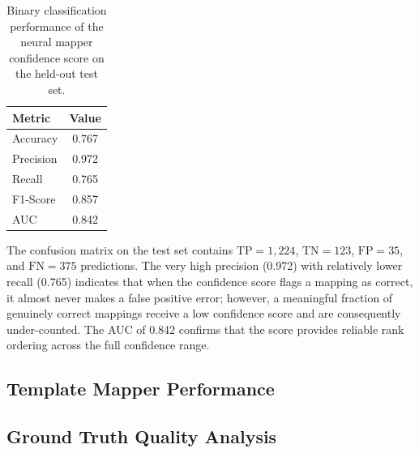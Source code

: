 \documentclass[12pt]{article}
\begin{document}
\begin{table}[htbp]
  \centering
  \caption{Binary classification performance of the neural mapper
    confidence score on the held-out test set.}
  \label{tab:confidence_metrics}
  \begin{tabular}{lc}
    \toprule
    \textbf{Metric} & \textbf{Value} \\
    \midrule
    Accuracy  & 0.767 \\
    Precision & 0.972 \\
    Recall    & 0.765 \\
    F1-Score  & 0.857 \\
    AUC       & 0.842 \\
    \bottomrule
  \end{tabular}
\end{table}

The confusion matrix on the test set contains
$\mathrm{TP} = 1{,}224$, $\mathrm{TN} = 123$, $\mathrm{FP} = 35$, and
$\mathrm{FN} = 375$ predictions.  The very high precision (0.972) with
relatively lower recall (0.765) indicates that when the confidence score
flags a mapping as correct, it almost never makes a false positive
error; however, a meaningful fraction of genuinely correct mappings
receive a low confidence score and are consequently under-counted.
The AUC of 0.842 confirms that the score provides reliable rank
ordering across the full confidence range.


\subsection{Template Mapper Performance}
\label{subsec:template_perf}


\subsection{Ground Truth Quality Analysis}
\label{subsec:gt_quality}
\end{document}
